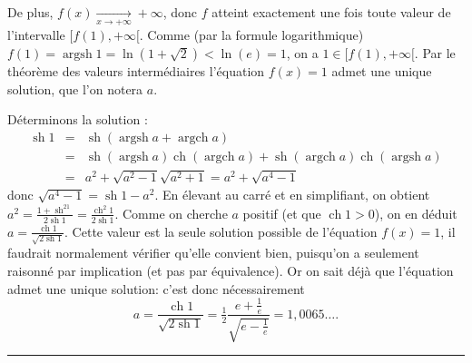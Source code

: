 \documentclass[11pt,a4paper]{article}
\newcommand{\ch}{\mathop{\mathrm{ch}}\nolimits}
\newcommand{\sh}{\mathop{\mathrm{sh}}\nolimits}
\newcommand{\Argsh}{\mathop{\mathrm{argsh}}\nolimits}
\newcommand{\Argch}{\mathop{\mathrm{argch}}\nolimits}
\newcommand{\fincorrection}{\vspace{1mm}\hrule\vspace*{7mm}}
\begin{document}
\begin{center}
\end{center}

De plus, $f(x)\xrightarrow[x\to +\infty]{}+\infty$, donc $f$ atteint exactement une fois 
toute valeur de l'intervalle $[f(1),+\infty[$. Comme (par la formule logarithmique)
$f(1)=\Argsh 1=\ln(1+\sqrt{2})<\ln(e)=1$, 
on a $1\in[f(1),+\infty[$. Par le théorème des valeurs intermédiaires
l'équation $f(x)=1$ admet une unique solution, que l'on notera $a$. 

\medskip

Déterminons la solution :
\begin{eqnarray*}
\sh 1&=&\sh(\Argsh a+\Argch a)\\ 
 &=&\sh(\Argsh a)\ch(\Argch a)+\sh(\Argch a)\ch(\Argsh a)\\
 &=&a^2+\sqrt{a^2-1}\sqrt{a^2+1}=a^2+\sqrt{a^4-1}
\end{eqnarray*}
donc $\sqrt{a^4-1}=\sh 1-a^2$. En élevant au carré et en simplifiant, on obtient
$a^2=\frac{1+\sh^21}{2\sh 1}=\frac{\ch^2 1}{2\sh 1}$. Comme on cherche $a$ positif 
(et que $\ch 1>0$), on en déduit $a=\frac{\ch 1}{\sqrt{2\sh 1}}$. 
Cette valeur est la seule solution possible de l'équation $f(x)=1$, il faudrait normalement 
vérifier qu'elle convient bien, puisqu'on a seulement raisonné par implication (et pas par équivalence).
Or on sait déjà que l'équation admet une unique solution: c'est donc nécessairement 
$$a=\frac{\ch 1}{\sqrt{2\sh 1}}= \tfrac{1}{2}\frac{e+\frac1e}{\sqrt{e-\frac1e}} = 1,0065\ldots.$$
\fincorrection
\end{document}
